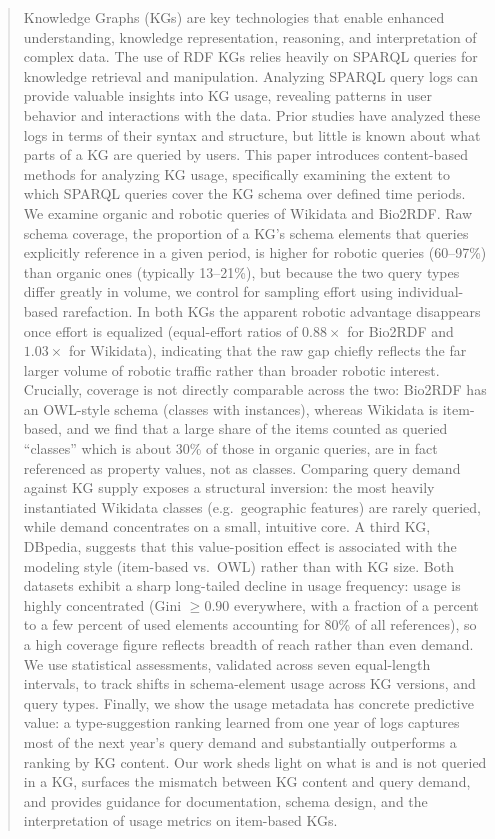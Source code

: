 \documentclass[sw]{iosart2x}
\begin{document}
\begin{frontmatter}
\begin{abstract}
Knowledge Graphs (KGs) are key technologies that enable enhanced understanding, knowledge representation, reasoning, and interpretation of complex data. The use of RDF KGs relies heavily on SPARQL queries for knowledge retrieval and manipulation. Analyzing SPARQL query logs can provide valuable insights into KG usage, revealing patterns in user behavior and interactions with the data. Prior studies have analyzed these logs in terms of their syntax and structure, but little is known about what parts of a KG are queried by users. This paper introduces content-based methods for analyzing KG usage, specifically examining the extent to which SPARQL queries cover the KG schema over defined time periods. We examine organic and robotic queries of Wikidata and Bio2RDF. Raw schema coverage, the proportion of a KG's schema elements that queries explicitly reference in a given period, is higher for robotic queries (60--97\%) than organic ones (typically 13--21\%), but because the two query types differ greatly in volume, we control for sampling effort using individual-based rarefaction. In both KGs the apparent robotic advantage disappears once effort is equalized (equal-effort ratios of $0.88\times$ for Bio2RDF and $1.03\times$ for Wikidata), indicating that the raw gap chiefly reflects the far larger volume of robotic traffic rather than broader robotic interest. Crucially, coverage is not directly comparable across the two: Bio2RDF has an OWL-style schema (classes with instances), whereas Wikidata is item-based, and we find that a large share of the items counted as queried ``classes'' which is about 30\% of those in organic queries, are in fact referenced as property values, not as classes. Comparing query demand against KG supply exposes a structural inversion: the most heavily instantiated Wikidata classes (e.g.\ geographic features) are rarely queried, while demand concentrates on a small, intuitive core. A third KG, DBpedia, suggests that this value-position effect is associated with the modeling style (item-based vs.\ OWL) rather than with KG size. Both datasets exhibit a sharp long-tailed decline in usage frequency: usage is highly concentrated (Gini $\geq 0.90$ everywhere, with a fraction of a percent to a few percent of used elements accounting for 80\% of all references), so a high coverage figure reflects breadth of reach rather than even demand. We use statistical assessments, validated across seven equal-length intervals, to track shifts in schema-element usage across KG versions, and query types. Finally, we show the usage metadata has concrete predictive value: a type-suggestion ranking learned from one year of logs captures most of the next year's query demand and substantially outperforms a ranking by KG content. Our work sheds light on what is and is not queried in a KG, surfaces the mismatch between KG content and query demand, and provides guidance for documentation, schema design, and the interpretation of usage metrics on item-based KGs.
\end{abstract}


\end{frontmatter}
\end{document}
